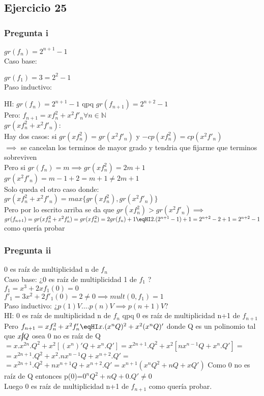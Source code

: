 \subsection{Ejercicio 25}
\subsubsection{Pregunta i}
$gr(f_n) = 2^{n+1}-1$ \\
Caso base:

$gr(f_1) = 3 = 2^{2}-1$ \\
Paso inductivo:

HI: $gr(f_n) = 2^{n+1}-1$ qpq $gr(f_{n+1}) = 2^{n+2}-1$ \\
Pero:
$f_{n+1} = xf_{n}^{2}+x^{2}f'_n \forall n \in \mathbb{N}$ \\
$gr(xf_{n}^{2}+x^{2}f'_n):$ \\
Hay dos casos: si $gr(xf_n^2)=gr(x^{2}f'_n)$ y $-cp(xf_n^2)=cp(x^{2}f'_n)$ \\
$\implies$ se cancelan los terminos de mayor grado y tendria que fijarme que terminos sobreviven \\
Pero si $gr(f_n)=m \implies gr(xf_n^2)=2m+1$ \\
$gr(x^{2}f'_n) = m-1+2=m+1 \neq 2m+1$ \\
Solo queda el otro caso donde: \\
$gr(xf_{n}^{2}+x^{2}f'_n) = max\{gr(xf_n^2),gr(x^{2}f'_n)\}$ \\
Pero por lo escrito arriba se da que $gr(xf_n^2) > gr(x^{2}f'_n) \implies$ \\
$gr(f_{n+1})=gr(xf_{n}^{2}+x^{2}f'_n)=gr(xf_{n}^{2})=2gr(f_n)+1 \eqHI 2.(2^{n+1}-1)+1=2^{n+2}-2+1=2^{n+2}-1$ como quería probar

\subsubsection{Pregunta ii}
0 es raíz de multiplicidad n de $f_n$ \\
Caso base: ¿0 es raíz de multiplicidad 1 de $f_1$ ? \\
$f_1 = x^3+2x f_1(0)=0$ \\
$f'_1=3x^2+2 f'_1(0)=2 \neq 0 \implies mult(0,f_1)=1$ \\
Paso inductivo: ¿$p(1)V....p(n)V \implies p(n+1)V$? \\
HI: 0 es raíz de multiplicidad n de $f_n$ qpq 0 es raíz de multiplicidad n+1 de $f_{n+1}$ \\
Pero $f_{n+1}=xf_n^2+x^2f'_n \eqHI x.(x^nQ)^2+x^2(x^nQ)'$ donde Q es un polinomio tal que $x\cancel{|}Q$ osea 0 no es raíz de Q \\
$=x.x^{2n}.Q^{2}+x^2[(x^n)'Q+x^n.Q']= x^{2n+1}.Q^2+x^{2}[nx^{n-1}Q+x^n.Q'] =$ \\
$=x^{2n+1}.Q^2+x^2.nx^{n-1}Q+x^{n+2}.Q' =$ \\
$=x^{2n+1}.Q^2+nx^{n+1}Q+x^{n+2}.Q'= x^{n+1}(x^nQ^2+nQ+xQ')$ Como 0 no es raíz de Q entonces p(0)=$0^nQ^2+nQ+0.Q' \neq 0$ \\
Luego 0 es raíz de multiplicidad n+1 de $f_{n+1}$ como quería probar.

